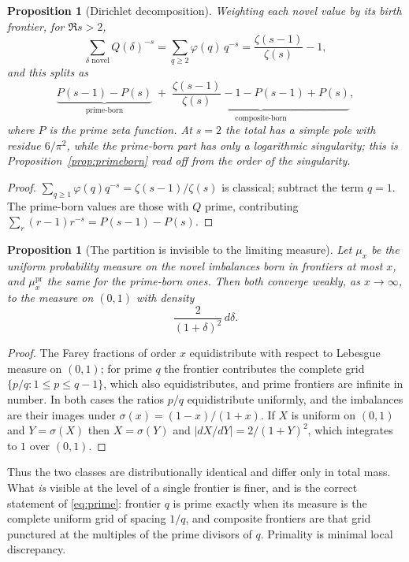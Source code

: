 \documentclass[11pt,a4paper]{article}
\theoremstyle{plain}
\newtheorem{proposition}[theorem]{Proposition}
\theoremstyle{definition}
\theoremstyle{remark}
\begin{document}
\begin{proposition}[Dirichlet decomposition]\label{prop:dirichlet}
Weighting each novel value by its birth frontier, for $\Re s > 2$,
\[
  \sum_{\delta \text{ novel}} Q(\delta)^{-s}
  = \sum_{q \ge 2} \varphi(q)\, q^{-s}
  = \frac{\zeta(s-1)}{\zeta(s)} - 1 ,
\]
and this splits as
\[
  \underbrace{P(s-1) - P(s)}_{\text{prime-born}}
  \;+\;
  \underbrace{\frac{\zeta(s-1)}{\zeta(s)} - 1 - P(s-1) + P(s)}_{\text{composite-born}},
\]
where $P$ is the prime zeta function. At $s = 2$ the total has a simple pole
with residue $6/\pi^2$, while the prime-born part has only a logarithmic
singularity; this is Proposition~\ref{prop:primeborn} read off from the order of
the singularity.
\end{proposition}

\begin{proof}
$\sum_{q\ge1}\varphi(q)q^{-s} = \zeta(s-1)/\zeta(s)$ is classical; subtract the
term $q=1$. The prime-born values are those with $Q$ prime, contributing
$\sum_{r} (r-1) r^{-s} = P(s-1) - P(s)$.
\end{proof}

\begin{proposition}[The partition is invisible to the limiting measure]
\label{prop:measures}
Let $\mu_x$ be the uniform probability measure on the novel imbalances born in
frontiers at most $x$, and $\mu_x^{\mathrm{pr}}$ the same for the prime-born
ones. Then both converge weakly, as $x \to \infty$, to the measure on $(0,1)$
with density
\[
  \frac{2}{(1+\delta)^2}\,d\delta .
\]
\end{proposition}

\begin{proof}
The Farey fractions of order $x$ equidistribute with respect to Lebesgue measure
on $(0,1)$; for prime $q$ the frontier contributes the complete grid
$\{p/q : 1 \le p \le q-1\}$, which also equidistributes, and prime frontiers are
infinite in number. In both cases the ratios $p/q$ equidistribute uniformly, and
the imbalances are their images under $\sigma(x) = (1-x)/(1+x)$. If $X$ is
uniform on $(0,1)$ and $Y = \sigma(X)$ then $X = \sigma(Y)$ and
$|dX/dY| = 2/(1+Y)^2$, which integrates to $1$ over $(0,1)$.
\end{proof}

Thus the two classes are distributionally identical and differ only in total
mass. What \emph{is} visible at the level of a single frontier is finer, and is
the correct statement of \eqref{eq:prime}: frontier $q$ is prime exactly when
its measure is the complete uniform grid of spacing $1/q$, and composite
frontiers are that grid punctured at the multiples of the prime divisors of $q$.
Primality is minimal local discrepancy.
\end{document}
